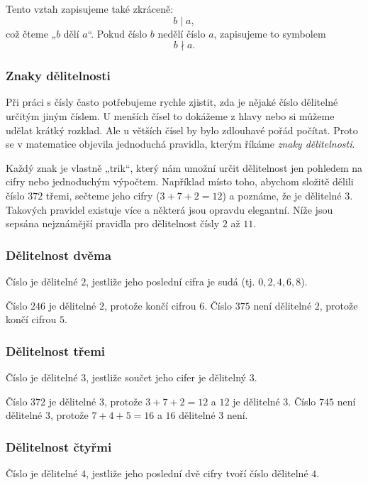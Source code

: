 \documentclass[12pt,a4paper]{article}
\begin{document}
Tento vztah zapisujeme také zkráceně:
\[
b \mid a,
\]
což čteme „$b$ dělí $a$“.  
Pokud číslo $b$ nedělí číslo $a$, zapisujeme to symbolem
\[
b \nmid a.
\]


\subsubsection*{Znaky dělitelnosti}

Při práci s čísly často potřebujeme rychle zjistit, zda je nějaké číslo dělitelné určitým jiným číslem.  
U menších čísel to dokážeme z hlavy nebo si můžeme udělat krátký rozklad.  
Ale u větších čísel by bylo zdlouhavé pořád počítat. Proto se v matematice objevila jednoduchá pravidla, kterým říkáme \emph{znaky dělitelnosti}.  

Každý znak je vlastně „trik“, který nám umožní určit dělitelnost jen pohledem na cifry nebo jednoduchým výpočtem.  
Například místo toho, abychom složitě dělili číslo $372$ třemi, sečteme jeho cifry ($3+7+2=12$) a poznáme, že je dělitelné $3$.  
Takových pravidel existuje více a některá jsou opravdu elegantní.  
Níže jsou sepsána nejznámější pravidla pro dělitelnost čísly $2$ až $11$. 

\subsubsection*{Dělitelnost dvěma}
Číslo je dělitelné $2$, jestliže jeho poslední cifra je sudá (tj. $0,2,4,6,8$).  

\begin{examplebox}
Číslo $246$ je dělitelné $2$, protože končí cifrou $6$.  
Číslo $375$ není dělitelné $2$, protože končí cifrou $5$.
\end{examplebox}

\subsubsection*{Dělitelnost třemi}
Číslo je dělitelné $3$, jestliže součet jeho cifer je dělitelný $3$.  

\begin{examplebox}
Číslo $372$ je dělitelné $3$, protože $3+7+2=12$ a $12$ je dělitelné $3$.  
Číslo $745$ není dělitelné $3$, protože $7+4+5=16$ a $16$ dělitelné $3$ není.
\end{examplebox}

\subsubsection*{Dělitelnost čtyřmi}
Číslo je dělitelné $4$, jestliže jeho poslední dvě cifry tvoří číslo dělitelné $4$.  
\end{document}
